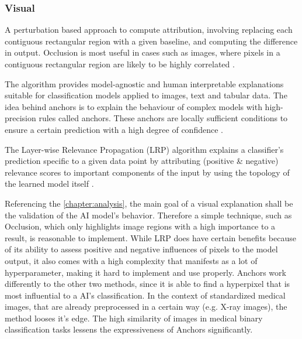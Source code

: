\documentclass[11pt,a4paper,english]{scrreprt}
\begin{document}
\subsubsection*{Visual}
\begin{description}[font=\normalfont\itshape]
    \item[Occlusion:] A perturbation based approach to compute attribution, involving replacing each contiguous rectangular region with a given baseline, and computing the difference in output. Occlusion is most useful in cases such as images, where pixels in a contiguous rectangular region are likely to be highly correlated \parencite{captum_website,zeiler_visualizing_2013}.
    \item[Anchors:] The algorithm provides model-agnostic and human interpretable explanations suitable for classification models applied to images, text and tabular data. The idea behind anchors is to explain the behaviour of complex models with high-precision rules called anchors. These anchors are locally sufficient conditions to ensure a certain prediction with a high degree of confidence \parencite{ribeiro_anchors_2018}.
    \item[LRP:] The Layer-wise Relevance Propagation (LRP) algorithm explains a classifier's prediction specific to a given data point by attributing (positive \& negative) relevance scores to important components of the input by using the topology of the learned model itself \parencite{lapuschkin_unmasking_2019}.
\end{description}
Referencing the \autoref{chapter:analysis}, the main goal of a visual explanation shall be the validation of the AI model's behavior. Therefore a simple technique, such as Occlusion, which only highlights image regions with a high importance to a result, is reasonable to implement. While LRP does have certain benefits because of its ability to assess positive and negative influences of pixels to the model output, it also comes with a high complexity that manifests as a lot of hyperparameter, making it hard to implement and use properly. Anchors work differently to the other two methods, since it is able to find a hyperpixel that is most influential to a AI's classification. In the context of standardized medical images, that are already preprocessed in a certain way (e.g. X-ray images), the method looses it's edge. The high similarity of images in medical binary classification tasks lessens the expressiveness of Anchors significantly.    
\end{document}
